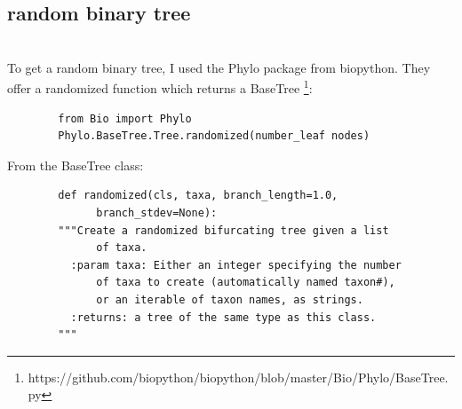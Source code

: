     \subsection{random binary tree}
       \\
      To get a random binary tree, I used the Phylo package from biopython. They offer a randomized
        function which returns a BaseTree \footnote{
          https://github.com/biopython/biopython/blob/master/Bio/Phylo/BaseTree.py
        }:
      \begin{lstlisting}
        from Bio import Phylo
        Phylo.BaseTree.Tree.randomized(number_leaf nodes)
      \end{lstlisting}
      From the BaseTree class:
      \begin{lstlisting}
        def randomized(cls, taxa, branch_length=1.0, 
              branch_stdev=None):
        """Create a randomized bifurcating tree given a list
              of taxa.
          :param taxa: Either an integer specifying the number
              of taxa to create (automatically named taxon#), 
              or an iterable of taxon names, as strings.
          :returns: a tree of the same type as this class.
        """
      \end{lstlisting}


